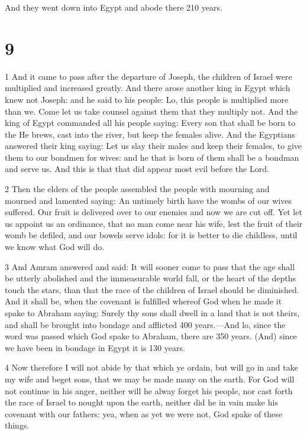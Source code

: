 \par And they went down into Egypt and abode there 210 years.

\chapter{9}

\par 1 And it came to pass after the departure of Joseph, the children of Israel were multiplied and increased greatly. And there arose another king in Egypt which knew not Joseph: and he said to his people: Lo, this people is multiplied more than we. Come let us take counsel against them that they multiply not. And the king of Egypt commanded all his people saying: Every son that shall be born to the He brews, cast into the river, but keep the females alive. And the Egyptians answered their king saying: Let us slay their males and keep their females, to give them to our bondmen for wives: and he that is born of them shall be a bondman and serve us. And this is that that did appear most evil before the Lord.

\par 2 Then the elders of the people assembled the people with mourning and mourned and lamented saying: An untimely birth have the wombs of our wives suffered. Our fruit is delivered over to our enemies and now we are cut off. Yet let us appoint us an ordinance, that no man come near his wife, lest the fruit of their womb be defiled, and our bowels serve idols: for it is better to die childless, until we know what God will do.

\par 3 And Amram answered and said: It will sooner come to pass that the age shall be utterly abolished and the immeasurable world fall, or the heart of the depths touch the stars, than that the race of the children of Israel should be diminished. And it shall be, when the covenant is fulfilled whereof God when he made it spake to Abraham saying: Surely thy sons shall dwell in a land that is not theirs, and shall be brought into bondage and afflicted 400 years.—And lo, since the word was passed which God spake to Abraham, there are 350 years. (And) since we have been in bondage in Egypt it is 130 years. 

\par 4 Now therefore I will not abide by that which ye ordain, but will go in and take my wife and beget sons, that we may be made many on the earth. For God will not continue in his anger, neither will he alway forget his people, nor cast forth the race of Israel to nought upon the earth, neither did he in vain make his covenant with our fathers: yea, when as yet we were not, God spake of these things. 

